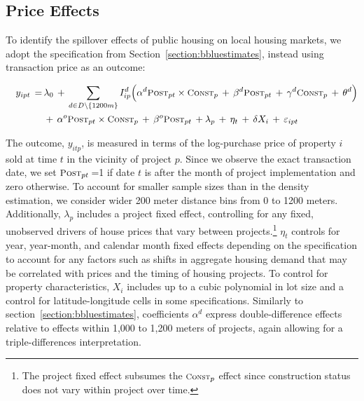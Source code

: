 \documentclass[12pt]{article}
\begin{document}
\subsection{Price Effects}\label{section:resultsprices}

To identify the spillover effects of public housing on local housing markets, we adopt the specification from Section~\ref{section:bbluestimates}, instead using transaction price as an outcome:

\begin{equation} \label{equation:prices}
\begin{aligned}
\quad y_{ipt} \, =& \, \lambda_{0} \,+\, \sum\limits_{d\in D\setminus\{1200m\}} I^d_{ip}\Big( \alpha^d \textsc{\small Post}_{pt}\times\textsc{\small Const}_{p} \, + \, \beta^d\textsc{\small Post}_{pt} \, + \, \gamma^d\textsc{\small Const}_{p} \, + \, \theta^{d} \Big) \\
& \, + \, \alpha^o \textsc{\small Post}_{pt}\times\textsc{\small Const}_{p} \, + \, \beta^o\textsc{\small Post}_{pt} \, +  \lambda_p \, + \, \eta_t \, + \, \delta X_i \, + \, \varepsilon_{ipt} \quad 
\end{aligned}
\end{equation}

\noindent The outcome, $y_{itp}$, is measured in terms of the log-purchase price of property $i$ sold at time $t$ in the vicinity of project $p$.  Since we observe the exact transaction date, we set $\textsc{\small Post}_{pt}$\,=1 if date $t$ is after the month of project implementation and zero otherwise.  To account for smaller sample sizes than in the density estimation, we consider wider 200 meter distance bins from 0 to 1200 meters.  Additionally, $\lambda_p$ includes a project fixed effect, controlling for any fixed, unobserved drivers of house prices that vary between projects.\footnote{The project fixed effect subsumes the $\textsc{\footnotesize Const}_{p}$ effect since construction status does not vary within project over time.}  $\eta_{t}$ controls for year, year-month, and calendar month fixed effects depending on the specification to account for any factors such as shifts in aggregate housing demand that may be correlated with prices and the timing of housing projects.  To control for property characteristics, $X_i$ includes up to a cubic polynomial in lot size and a control for latitude-longitude cells in some specifications. Similarly to section~\ref{section:bbluestimates}, coefficients $\alpha^d$ express double-difference effects relative to effects within 1,000 to 1,200 meters of projects, again allowing for a triple-differences interpretation.  
\end{document}
